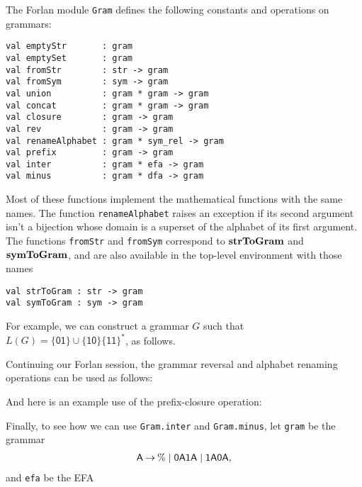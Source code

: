 The Forlan module \texttt{Gram} defines the following constants
and operations on grammars:
\begin{verbatim}
val emptyStr       : gram
val emptySet       : gram
val fromStr        : str -> gram
val fromSym        : sym -> gram
val union          : gram * gram -> gram
val concat         : gram * gram -> gram
val closure        : gram -> gram
val rev            : gram -> gram
val renameAlphabet : gram * sym_rel -> gram
val prefix         : gram -> gram
val inter          : gram * efa -> gram
val minus          : gram * dfa -> gram
\end{verbatim}
%
%
%
%
%
%
%
%
%
%
%
%
Most of these functions implement the mathematical functions with the
same names. The function \texttt{renameAlphabet} raises an exception
if its second argument isn't a bijection whose domain is a superset of
the alphabet of its first argument.  The functions \texttt{fromStr}
and \texttt{fromSym} correspond to $\mathbf{strToGram}$ and $\mathbf{symToGram}$,
and are also available in the top-level environment with those names
\begin{verbatim}
val strToGram : str -> gram
val symToGram : sym -> gram
\end{verbatim}
%
%

For example, we can construct a grammar $G$ such that
$L(G)=\mathsf{\{01\}\cup\{10\}\{11\}^*}$, as follows.

Continuing our Forlan session, the grammar reversal and alphabet
renaming operations can be used as follows:

And here is an example use of the prefix-closure operation:


Finally, to see how we can use \texttt{Gram.inter} and
\texttt{Gram.minus}, let \texttt{gram} be the grammar
\begin{gather*}
  \mathsf{A} \mathbin{\to} \% \mid \mathsf{0A1A} \mid \mathsf{1A0A} ,
\end{gather*}
and \texttt{efa} be the EFA
\begin{center}
  
\end{center}


